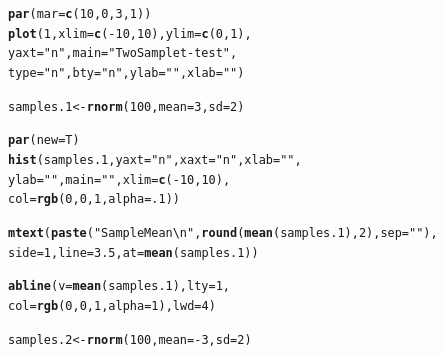 \documentclass{tufte-book}\usepackage[]{graphicx}\usepackage[]{color}
\makeatletter
\newcommand{\hlnum}[1]{\textcolor[rgb]{0.686,0.059,0.569}{#1}}%
\newcommand{\hlstr}[1]{\textcolor[rgb]{0.192,0.494,0.8}{#1}}%
\newcommand{\hlopt}[1]{\textcolor[rgb]{0,0,0}{#1}}%
\newcommand{\hlstd}[1]{\textcolor[rgb]{0.345,0.345,0.345}{#1}}%
\newcommand{\hlkwb}[1]{\textcolor[rgb]{0.69,0.353,0.396}{#1}}%
\newcommand{\hlkwc}[1]{\textcolor[rgb]{0.333,0.667,0.333}{#1}}%
\newcommand{\hlkwd}[1]{\textcolor[rgb]{0.737,0.353,0.396}{\textbf{#1}}}%
\newenvironment{kframe}{%
 \def\at@end@of@kframe{}%
 \ifinner\ifhmode%
  \def\at@end@of@kframe{\end{minipage}}%
  \begin{minipage}{\columnwidth}%
 \fi\fi%
 \def\FrameCommand##1{\hskip\@totalleftmargin \hskip-\fboxsep
 \colorbox{shadecolor}{##1}\hskip-\fboxsep
     \hskip-\linewidth \hskip-\@totalleftmargin \hskip\columnwidth}%
 \MakeFramed {\advance\hsize-\width
   \@totalleftmargin\z@ \linewidth\hsize
   \@setminipage}}%
 {\par\unskip\endMakeFramed%
 \at@end@of@kframe}
\newenvironment{knitrout}{}{} %
\makeatother
\begin{document}
\begin{marginfigure}
\begin{tiny}
\begin{knitrout}
\color{fgcolor}\begin{kframe}
\begin{alltt}
\hlkwd{par}\hlstd{(}\hlkwc{mar} \hlstd{=} \hlkwd{c}\hlstd{(}\hlnum{10}\hlstd{,} \hlnum{0}\hlstd{,} \hlnum{3}\hlstd{,} \hlnum{1}\hlstd{))}
\hlkwd{plot}\hlstd{(}\hlnum{1}\hlstd{,} \hlkwc{xlim} \hlstd{=} \hlkwd{c}\hlstd{(}\hlopt{-}\hlnum{10}\hlstd{,} \hlnum{10}\hlstd{),} \hlkwc{ylim} \hlstd{=} \hlkwd{c}\hlstd{(}\hlnum{0}\hlstd{,} \hlnum{1}\hlstd{),}
     \hlkwc{yaxt} \hlstd{=} \hlstr{"n"}\hlstd{,} \hlkwc{main} \hlstd{=} \hlstr{"Two Sample t-test"}\hlstd{,}
     \hlkwc{type} \hlstd{=} \hlstr{"n"}\hlstd{,} \hlkwc{bty} \hlstd{=} \hlstr{"n"}\hlstd{,} \hlkwc{ylab} \hlstd{=} \hlstr{""}\hlstd{,} \hlkwc{xlab} \hlstd{=} \hlstr{""}\hlstd{)}

\hlstd{samples.1} \hlkwb{<-} \hlkwd{rnorm}\hlstd{(}\hlnum{100}\hlstd{,} \hlkwc{mean} \hlstd{=} \hlnum{3}\hlstd{,} \hlkwc{sd} \hlstd{=} \hlnum{2}\hlstd{)}

\hlkwd{par}\hlstd{(}\hlkwc{new} \hlstd{= T)}
\hlkwd{hist}\hlstd{(samples.1,} \hlkwc{yaxt} \hlstd{=} \hlstr{"n"}\hlstd{,} \hlkwc{xaxt} \hlstd{=} \hlstr{"n"}\hlstd{,} \hlkwc{xlab} \hlstd{=} \hlstr{""}\hlstd{,}
     \hlkwc{ylab} \hlstd{=} \hlstr{""}\hlstd{,} \hlkwc{main} \hlstd{=} \hlstr{""}\hlstd{,} \hlkwc{xlim} \hlstd{=} \hlkwd{c}\hlstd{(}\hlopt{-}\hlnum{10}\hlstd{,} \hlnum{10}\hlstd{),}
     \hlkwc{col} \hlstd{=} \hlkwd{rgb}\hlstd{(}\hlnum{0}\hlstd{,} \hlnum{0}\hlstd{,} \hlnum{1}\hlstd{,} \hlkwc{alpha} \hlstd{=} \hlnum{.1}\hlstd{))}

\hlkwd{mtext}\hlstd{(}\hlkwd{paste}\hlstd{(}\hlstr{"Sample Mean\textbackslash{}n"}\hlstd{,} \hlkwd{round}\hlstd{(}\hlkwd{mean}\hlstd{(samples.1),} \hlnum{2}\hlstd{),} \hlkwc{sep} \hlstd{=} \hlstr{""}\hlstd{),}
      \hlkwc{side} \hlstd{=} \hlnum{1}\hlstd{,} \hlkwc{line} \hlstd{=} \hlnum{3.5}\hlstd{,} \hlkwc{at} \hlstd{=} \hlkwd{mean}\hlstd{(samples.1))}

\hlkwd{abline}\hlstd{(}\hlkwc{v} \hlstd{=} \hlkwd{mean}\hlstd{(samples.1),} \hlkwc{lty} \hlstd{=} \hlnum{1}\hlstd{,}
       \hlkwc{col} \hlstd{=} \hlkwd{rgb}\hlstd{(}\hlnum{0}\hlstd{,} \hlnum{0}\hlstd{,} \hlnum{1}\hlstd{,} \hlkwc{alpha} \hlstd{=} \hlnum{1}\hlstd{),} \hlkwc{lwd} \hlstd{=} \hlnum{4}\hlstd{)}

\hlstd{samples.2} \hlkwb{<-} \hlkwd{rnorm}\hlstd{(}\hlnum{100}\hlstd{,} \hlkwc{mean} \hlstd{=} \hlopt{-}\hlnum{3}\hlstd{,} \hlkwc{sd} \hlstd{=} \hlnum{2}\hlstd{)}


\end{alltt}
\end{kframe}
\end{knitrout}
\end{tiny}
\end{marginfigure}
\end{document}
